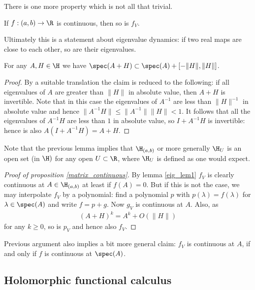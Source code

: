 There is one more property which is not all that trivial.

\begin{prop}\label{matrix_continuous}
	If $f : (a, b) \to \R$ is continuous, then so is $f_{V}$.
\end{prop}

Ultimately this is a statement about eigenvalue dynamics: if two real maps are close to each other, so are their eigenvalues.
\begin{lem}\label{eig_lem1}
	For any $A, H \in \H$ we have $\spec(A + H) \subset \spec(A) + [-\|H\|, \|H\|]$.
\end{lem}
\begin{proof}
	By a suitable translation the claim is reduced to the following: if all eigenvalues of $A$ are greater than $\|H\|$ in absolute value, then $A + H$ is invertible. Note that in this case the eigenvalues of $A^{-1}$ are less than $\|H\|^{-1}$ in absolute value and hence $\|A^{-1} H\| \leq \|A^{-1}\| \|H\| < 1$. It follows that all the eigenvalues of $A^{-1} H$ are less than $1$ in absolute value, so $I + A^{-1} H$ is invertible: hence is also $A (I + A^{-1} H) = A + H$.
\end{proof}

Note that the previous lemma implies that $\H_{(a, b)}$ or more generally $\H_{U}$ is an open set (in $\H)$ for any open $U \subset \R$, where $\H_{U}$ is defined as one would expect.

\begin{proof}[Proof of proposition \ref{matrix_continuous}]
	By lemma \ref{eig_lem1} $f_{V}$ is clearly continuous at $A \in \H_{(a, b)}$ at least if $f(A) = 0$. But if this is not the case, we may interpolate $f_{V}$ by a polynomial: find a polynomial $p$ with $p(\lambda) = f(\lambda)$ for $\lambda \in \spec(A)$ and write $f = p + g$. Now $g_{V}$ is continuous at $A$. Also, as
	\begin{align*}
		(A + H)^{k} = A^{k} + O(\|H\|)
	\end{align*}
	for any $k \geq 0$, so is $p_{V}$ and hence also $f_{V}$.
\end{proof}

Previous argument also implies a bit more general claim: $f_{V}$ is continuous at $A$, if and only if $f$ is continuous at $\spec(A)$.

\subsection{Holomorphic functional calculus}

